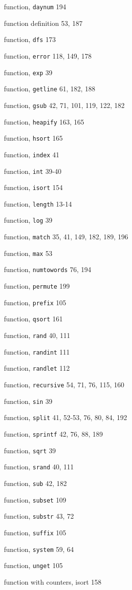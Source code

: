 \begin{multicols}{3}
function, \verb'daynum' 194

function definition 53, 187

function, \verb'dfs' 173

function, \verb'error' 118, 149, 178

function, \verb'exp' 39

function, \verb'getline' 61, 182, 188

function, \verb'gsub' 42, 71, 101, 119, 122, 182

function, \verb'heapify' 163, 165

function, \verb'hsort' 165

function, \verb'index' 41

function, \verb'int' 39-40

function, \verb'isort' 154

function, \verb'length' 13-14

function, \verb'log' 39

function, \verb'match' 35, 41, 149, 182, 189, 196

function, \verb'max' 53

function, \verb'numtowords' 76, 194

function, \verb'permute' 199

function, \verb'prefix' 105

function, \verb'qsort' 161

function, \verb'rand' 40, 111

function, \verb'randint' 111

function, \verb'randlet' 112

function, \verb'recursive' 54, 71, 76, 115, 160

function, \verb'sin' 39

function, \verb'split' 41, 52-53, 76, 80, 84, 192

function, \verb'sprintf' 42, 76, 88, 189

function, \verb'sqrt' 39

function, \verb'srand' 40, 111

function, \verb'sub' 42, 182

function, \verb'subset' 109

function, \verb'substr' 43, 72

function, \verb'suffix' 105

function, \verb'system' 59, 64

function, \verb'unget' 105

function with counters, isort 158


\end{multicols}
